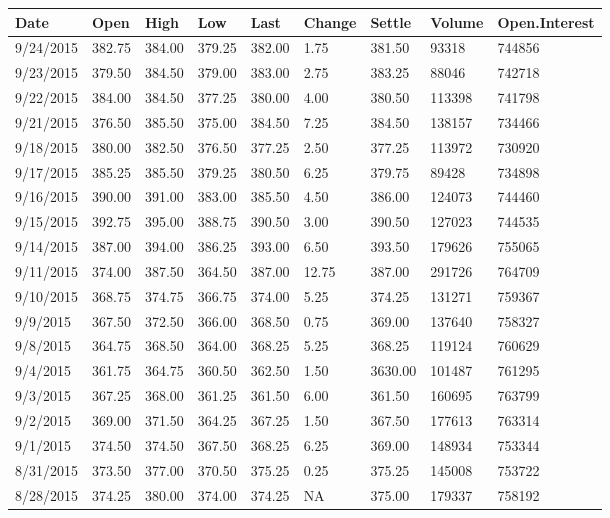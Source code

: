 \documentclass[]{book}
\theoremstyle{definition}
\theoremstyle{definition}
\theoremstyle{remark}
\begin{document}
\begin{tabular}{l|l|l|l|l|l|l|l|l}
\hline
Date & Open & High & Low & Last & Change & Settle & Volume & Open.Interest\\
\hline
9/24/2015 & 382.75 & 384.00 & 379.25 & 382.00 & 1.75 & 381.50 & 93318 & 744856\\
\hline
9/23/2015 & 379.50 & 384.50 & 379.00 & 383.00 & 2.75 & 383.25 & 88046 & 742718\\
\hline
9/22/2015 & 384.00 & 384.50 & 377.25 & 380.00 & 4.00 & 380.50 & 113398 & 741798\\
\hline
9/21/2015 & 376.50 & 385.50 & 375.00 & 384.50 & 7.25 & 384.50 & 138157 & 734466\\
\hline
9/18/2015 & 380.00 & 382.50 & 376.50 & 377.25 & 2.50 & 377.25 & 113972 & 730920\\
\hline
9/17/2015 & 385.25 & 385.50 & 379.25 & 380.50 & 6.25 & 379.75 & 89428 & 734898\\
\hline
9/16/2015 & 390.00 & 391.00 & 383.00 & 385.50 & 4.50 & 386.00 & 124073 & 744460\\
\hline
9/15/2015 & 392.75 & 395.00 & 388.75 & 390.50 & 3.00 & 390.50 & 127023 & 744535\\
\hline
9/14/2015 & 387.00 & 394.00 & 386.25 & 393.00 & 6.50 & 393.50 & 179626 & 755065\\
\hline
9/11/2015 & 374.00 & 387.50 & 364.50 & 387.00 & 12.75 & 387.00 & 291726 & 764709\\
\hline
9/10/2015 & 368.75 & 374.75 & 366.75 & 374.00 & 5.25 & 374.25 & 131271 & 759367\\
\hline
9/9/2015 & 367.50 & 372.50 & 366.00 & 368.50 & 0.75 & 369.00 & 137640 & 758327\\
\hline
9/8/2015 & 364.75 & 368.50 & 364.00 & 368.25 & 5.25 & 368.25 & 119124 & 760629\\
\hline
9/4/2015 & 361.75 & 364.75 & 360.50 & 362.50 & 1.50 & 3630.00 & 101487 & 761295\\
\hline
9/3/2015 & 367.25 & 368.00 & 361.25 & 361.50 & 6.00 & 361.50 & 160695 & 763799\\
\hline
9/2/2015 & 369.00 & 371.50 & 364.25 & 367.25 & 1.50 & 367.50 & 177613 & 763314\\
\hline
9/1/2015 & 374.50 & 374.50 & 367.50 & 368.25 & 6.25 & 369.00 & 148934 & 753344\\
\hline
8/31/2015 & 373.50 & 377.00 & 370.50 & 375.25 & 0.25 & 375.25 & 145008 & 753722\\
\hline
8/28/2015 & 374.25 & 380.00 & 374.00 & 374.25 & NA & 375.00 & 179337 & 758192\\

\end{tabular}
\end{document}

